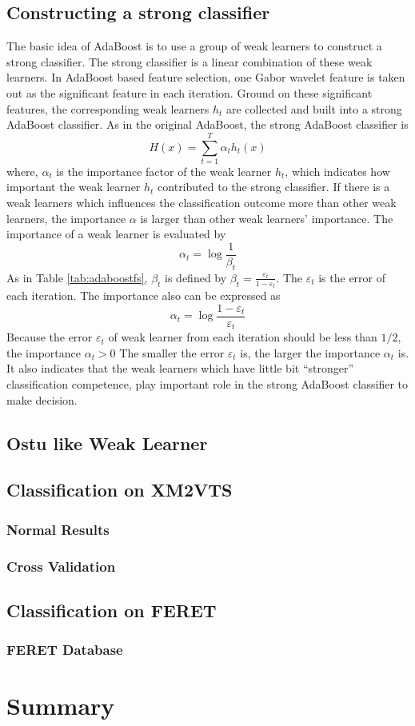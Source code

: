 \subsection{Constructing a strong classifier}
The basic idea of AdaBoost is to use a group of weak learners to construct a strong classifier. The strong classifier is a linear combination of these weak learners. In AdaBoost based feature selection, one Gabor wavelet feature is taken out as the significant feature in each iteration. Ground on these significant features, the corresponding weak learners $h_{t}$ are collected and built into a strong AdaBoost classifier. As in the original AdaBoost, the strong AdaBoost classifier is 
\begin{displaymath}
 H(x)  =  \sum_{t=1}^{T}\alpha_{t}h_{t}(x)
\end{displaymath}
where, $\alpha_{t}$ is the importance factor of the weak learner $h_{t}$, which indicates how important the weak learner $h_{t}$ contributed to the strong classifier. If there is a weak learners which influences the classification outcome more than other weak learners, the importance $\alpha$ is larger than other weak learners' importance. The importance of a weak learner is evaluated by
\begin{equation}
 \alpha_{t} = \log \frac{1}{\beta_{t}}
\end{equation}
As in \mbox{Table} \ref{tab:adaboostfs}, $\beta_{t}$ is defined by $\beta_{t}=\frac{\varepsilon_{t}}{1-\varepsilon_{t}}$. The $\varepsilon_{t}$ is the error of each iteration. The importance also can be expressed as
\begin{displaymath}
 \alpha_{t} = \log \frac{1-\varepsilon_{t}}{\varepsilon_{t}}
\end{displaymath}
Because the error $\varepsilon_{t}$ of weak learner from each iteration should be less than $1/2$, the importance $\alpha_{t}>0$  The smaller the error $\varepsilon_{t}$ is, the larger the importance $\alpha_{t}$ is. It also indicates that the weak learners which have little bit ``stronger'' classification competence, play important role in the strong AdaBoost classifier to make decision. 

\subsection{Ostu like Weak Learner}

\subsection{Classification on XM2VTS}
\subsubsection{Normal Results}
\subsubsection{Cross Validation}
\subsection{Classification on FERET}
\subsubsection{FERET Database}
\section{Summary}